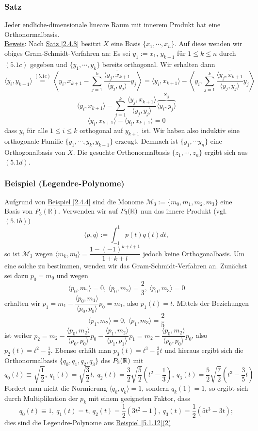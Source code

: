 \subsubsection{Satz}
\label{5.1.15}
Jeder endliche-dimensionale lineare Raum mit innerem Produkt hat eine Orthonormalbasis.\\
\underline{Beweis}: Nach \hyperref[2.4.8]{Satz \ref{2.4.8}} besitzt $X$ eine Basis $\{x_1,\cdots ,x_n\}$.  Auf diese wenden wir obiges Gram-Schmidt-Verfahren an: Es sei $y_1:=x_1$, $y_{k+1}$ für $1\leq k\leq n$ durch \hyperref[5.1c]{$(5.1c)$} gegeben und $\{y_1,\cdots ,y_k\}$ bereits orthogonal.  Wir erhalten dann
\[\langle y_i,y_{k+1}\rangle \stackrel{\hyperref[5.1c]{(5.1c)}}{=}\left\langle y_i,x_{k+1}-\sum _{j=1}^k\frac{\overline{\langle y_j,x_{k+1}}}{\langle y_j,y_j\rangle}y_j\right\rangle = \langle y_i,x_{k+1}\rangle - \left\langle y_i,\sum _{j=1}^k \frac{\overline{\langle y_j,x_{k+1}}}{\langle y_j,y_j\rangle}y_j\right\rangle\]
\[\langle y_i,x_{k+1}\rangle -\sum _{j=1}^k\frac{\langle y_j,x_{k+1}\rangle}{\langle y_j,y_j\rangle}\overbrace{\langle y_i,y_j\rangle}^{S_{ij}}\]
\[\langle y_i,x_{k+1}\rangle -\langle y_i,x_{k+1}\rangle = 0\]
dass $y_i$ für alle $1\leq i\leq k$ orthogonal auf $y_{k+1}$ ist.  Wir haben also induktiv eine orthogonale Familie $\{y_1,\cdots ,y_k,y_{k+1}\}$ erzeugt.  Demnach ist $\{y_1,\cdots y_n\}$ eine Orthogonalbasis von $X$.  Die gesuchte Orthonormalbasis $\{z_1,\cdots ,z_n\}$ ergibt sich aus \hyperref[5.1d]{$(5.1d)$}.
\subsubsection{Beispiel (Legendre-Polynome)}
Aufgrund von \hyperref[2.4.4]{Beispiel \ref{2.4.4}} sind die Monome $\mathcal{M}_3:=\{m_0,m_1,m_2,m_3\}$ eine Basis von $P_3(\mathbb{R})$.  Verwenden wir auf $P_3(\mathbb{R})$ nun das innere Produkt (vgl. \hyperref[5.1b]{$(5.1b)$})
\[\langle p,q\rangle := \int _{-1}^1 p(t)q(t)dt,\]
so ist $\mathcal{M}_3$ wegen $\langle m_k,m_l\rangle = \dfrac{1-(-1)^{k+l+1}}{1+k+l}$ jedoch keine Orthogonalbasis.  Um eine solche zu bestimmen, wenden wir das Gram-Schmidt-Verfahren an.  Zunächst sei dazu $p_0=m_0$ und wegen
\[\langle p_0,m_1\rangle = 0,\ \langle p_0,m_2\rangle = \frac{2}{3},\ \langle p_0,m_3\rangle = 0\]
erhalten wir $p_1=m_1-\dfrac{\langle p_0,m_1\rangle}{\langle p_0,p_0\rangle}p_0=m_1$, also $p_1(t)=t$.  Mittels der Beziehungen
\[\langle p_1,m_2\rangle =0,\ \langle p_1,m_3\rangle =\frac{2}{5}\]
ist weiter $p_2=m_2-\dfrac{\langle p_0,m_2\rangle}{\langle p_0,p_0\rangle}p_0-\dfrac{\langle p_1,m_2\rangle}{\langle p_1,p_1\rangle}p_1=m_2-\dfrac{\langle p_0,m_2\rangle}{\langle p_0,p_0\rangle}p_0$, also $p_2(t)=t^2-\frac{1}{3}$.  Ebenso erhält man $p_3(t)=t^3-\frac{3}{5}t$ und hieraus ergibt sich die Orthonormalbasis $\{q_0,q_1,q_2,q_3\}$ des $P_3(\mathbb{R})$ mit
\[q_0(t)\equiv\sqrt{\frac{1}{2}},\ q_1(t)=\sqrt{\frac{3}{2}}t,\ q_2(t)=\frac{3}{2}\sqrt{\frac{5}{2}}(t^2-\frac{1}{3}),\ q_3(t)=\frac{5}{2}\sqrt{\frac{7}{2}}(t^3-\frac{3}{5}t)\]
Fordert man nicht die Normierung $\langle q_k,q_k\rangle = 1$, sondern $q_k(1)=1$, so ergibt sich durch Multiplikation der $p_k$ mit einem geeigneten Faktor, dass
\[q_0(t)\equiv 1,\ q_1(t)=t,\ q_2(t)=\frac{1}{2}(3t^2-1),\ q_3(t)=\frac{1}{2}(5t^3-3t);\]
dies sind die Legendre-Polynome aus \hyperref[5.1.12]{Beispiel \ref{5.1.12}(2)}
